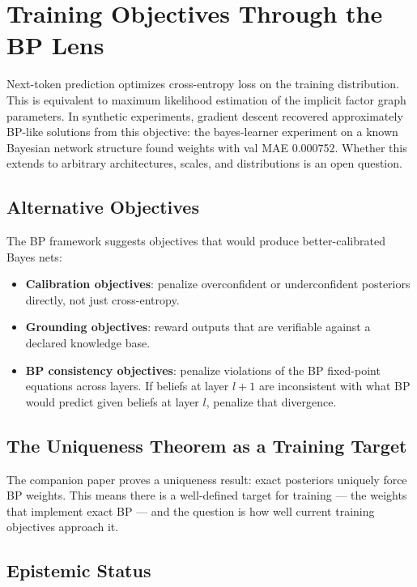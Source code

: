 \section{Training Objectives Through the BP Lens}
\label{sec:training}

Next-token prediction optimizes cross-entropy loss on the training
distribution. This is equivalent to maximum likelihood estimation of the
implicit factor graph parameters. In synthetic experiments, gradient
descent recovered approximately BP-like solutions from this objective:
the bayes-learner experiment on a known Bayesian network structure found
weights with val MAE 0.000752. Whether this extends to arbitrary
architectures, scales, and distributions is an open question.

\subsection*{Alternative Objectives}

The BP framework suggests objectives that would produce better-calibrated
Bayes nets:

\begin{itemize}
\item \textbf{Calibration objectives}: penalize overconfident or
underconfident posteriors directly, not just cross-entropy.

\item \textbf{Grounding objectives}: reward outputs that are verifiable
against a declared knowledge base.

\item \textbf{BP consistency objectives}: penalize violations of the BP
fixed-point equations across layers. If beliefs at layer $l+1$ are
inconsistent with what BP would predict given beliefs at layer $l$,
penalize that divergence.
\end{itemize}

\subsection*{The Uniqueness Theorem as a Training Target}

The companion paper proves a uniqueness result: exact posteriors uniquely
force BP weights. This means there is a well-defined target for training
--- the weights that implement exact BP --- and the question is how well
current training objectives approach it.

\subsection*{Epistemic Status}

